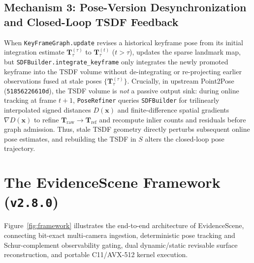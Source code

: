 \documentclass{evidencescene}
\begin{document}
\subsection{Mechanism 3: Pose-Version Desynchronization and Closed-Loop TSDF Feedback}
When \texttt{KeyFrameGraph.update} revises a historical keyframe pose from its initial integration estimate $\mathbf{T}_\tau^{(\tau)}$ to $\mathbf{T}_\tau^{(t)}$ ($t>\tau$),  updates the sparse landmark map, but \texttt{SDFBuilder.integrate\_keyframe} only integrates the newly promoted keyframe into the TSDF volume without de-integrating or re-projecting earlier observations fused at stale poses $\{\mathbf{T}_\tau^{(\tau)}\}$. Crucially, in upstream Point2Pose (\texttt{51856226610d}), the TSDF volume is \emph{not} a passive output sink: during online tracking at frame $t+1$, \texttt{PoseRefiner} queries \texttt{SDFBuilder} for trilinearly interpolated signed distances $D(\mathbf{x})$ and finite-difference spatial gradients $\nabla D(\mathbf{x})$ to refine $\mathbf{T}_{\mathrm{raw}}\to\mathbf{T}_{\mathrm{ref}}$ and recompute inlier counts and residuals before graph admission. Thus, stale TSDF geometry directly perturbs subsequent online pose estimates, and rebuilding the TSDF in $S$ alters the closed-loop pose trajectory.

\section{The EvidenceScene Framework (\texttt{v2.8.0})}
\label{sec:method}

Figure~\ref{fig:framework} illustrates the end-to-end architecture of EvidenceScene, connecting bit-exact multi-camera ingestion, deterministic pose tracking and Schur-complement observability gating, dual dynamic/static revisable surface reconstruction, and portable C11/AVX-512 kernel execution.
\end{document}
